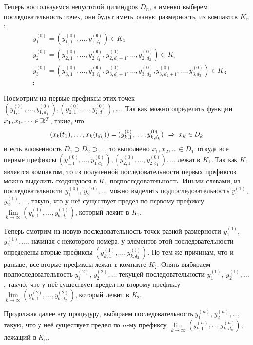 \begin{solution}
\begin{enumerate}
        Теперь воспользуемся непустотой цилиндров $D_n$, а именно выберем последовательность точек, они будут иметь разную размерность, из компактов $K_n$:
        \begin{align*}
            & y_1^{(0)} = (y_{1, 1}^{(0)}, \dots, y_{1, d_1}^{(0)}) \in K_1
            \\
            & y_2^{(0)} = (y_{2, 1}^{(0)}, \dots, y_{2, d_1}^{(0)}, y_{2, d_1+1}^{(0)}, \dots, y_{2, d_2}^{(0)}) \in K_2
            \\
            & y_3^{(0)} = (y_{3, 1}^{(0)}, \dots, y_{3, d_1}^{(0)}, y_{3, d_1+1}^{(0)}, \dots, y_{3, d_2}^{(0)}, y_{3, d_2+1}^{(0)}, \dots, y_{3, d_3}^{(0)}) \in K_3
            \\
            & \vdots
        \end{align*}

        Посмотрим на первые префиксы этих точек $(y_{1, 1}^{(0)}, \dots, y_{1, d_1}^{(0)}), (y_{2, 1}^{(0)}, \dots, y_{2, d_1}^{(0)}), \dots$. Так как можно определить функции $x_1, x_2, \dots \in \mathbb{R}^T$, такие, что
        \[
            (x_k(t_1), \dots, x_k(t_{d_k})) = (y_{k, 1}^{(0)}, \dots, y_{k, {d_k}}^{(0)}) \ \Rightarrow \ x_k \in D_k
        \]
        и есть вложенность $D_1 \supset D_2 \supset \dots$, то выполнено $x_1, x_2, \dots \in D_1$, откуда все первые префиксы $(y_{1, 1}^{(0)}, \dots, y_{1, d_1}^{(0)}), (y_{2, 1}^{(0)}, \dots, y_{2, d_1}^{(0)}), \dots$ лежат в $K_1$. Так как $K_1$ является компактом, то из полученной последовательности первых префиксов можно выделить сходящуюся в $K_1$ подпоследовательность. Иными словами, из последовательности $y_1^{(0)}$, $y_2^{(0)}, \dots$ можно выделить подпоследовательность $y_1^{(1)}$, $y_2^{(1)}, \dots$, такую, что у неё существует предел по первому префиксу $\lim\limits_{k \to \infty} (y_{k, 1}^{(1)}, \dots, y_{k, {d_1}}^{(1)})$, который лежит в $K_1$.

        Теперь смотрим на новую последовательность точек разной размерности $y_1^{(1)}$, $y_2^{(1)}, \dots$, начиная с некоторого номера, у элементов этой последовательности определены вторые префиксы $(y_{k, 1}^{(1)}, \dots, y_{k, d_2}^{(1)})$. По тем же причинам, что и раньше, все вторые префиксы лежат в компакте $K_2$. Опять выбираем подпоследовательность $y_1^{(2)}$, $y_2^{(2)}, \dots$ текущей последовательности $y_1^{(1)}$, $y_2^{(1)}, \dots$, такую, что у неё существует предел по второму префиксу $\lim\limits_{k \to \infty} (y_{k, 1}^{(2)}, \dots, y_{k, {d_2}}^{(2)})$, который лежит в $K_2$.

        Продолжая далее эту процедуру, выбираем последовательность $y_1^{(n)}$, $y_2^{(n)}, \dots$, такую, что у неё существует предел по $n$-му префиксу $\lim\limits_{k \to \infty} (y_{k, 1}^{(n)}, \dots, y_{k, {d_n}}^{(n)})$, лежащий в $K_n$.


\end{enumerate}
\end{solution}
